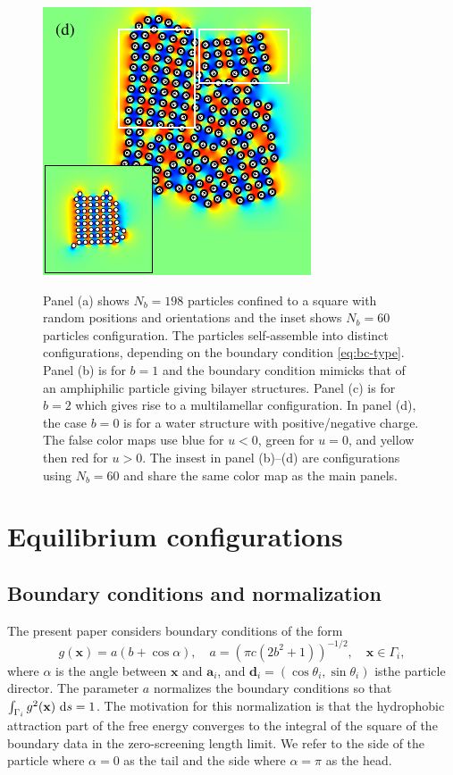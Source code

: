 \documentclass[prb,preprint,showpacs,preprintnumbers,amsmath,amssymb,longbibliography]{revtex4-1}
\renewcommand{\aa}{\mathbf{a}}
\newcommand{\dd}{\mathbf{d}}
\newcommand{\xx}{\mathbf{x}}
\begin{document}
\begin{figure}[h!]
\begin{center}
  \includegraphics[height=0.3\textheight]{Nb198d_eta_inset.pdf}
\end{center}
\begin{caption}{\label{fig:relax}
  Panel (a) shows $N_b = 198$ particles confined to a square with random 
  positions and orientations and the inset shows $N_b=60$ particles configuration.
  The particles self-assemble into distinct configurations,
  depending on the boundary condition \eqref{eq:bc-type}.
  Panel (b) is for $b=1$ and the boundary condition mimicks that
  of an amphiphilic particle giving bilayer structures. 
  Panel (c) is for $b=2$ which gives rise to a multilamellar configuration. 
  In panel (d), the case $b = 0$ is for a water structure with
  positive/negative charge. 
  The false color maps use blue for $u < 0$, green for $u = 0$, and yellow then red for $u > 0$.
  The insest in panel (b)--(d) are configurations using $N_b=60$ and share the same color map
  as the main panels.}
\end{caption}
\end{figure}

\section{Equilibrium configurations}
\subsection{Boundary conditions and normalization}
The present paper considers boundary conditions of the form
\begin{equation}
  \label{eq:bc-type}
g(\xx) = a(b + \cos \alpha),\quad a = (\pi c(2b^2 + 1))^{-1/2},\quad \xx \in \Gamma_i,
\end{equation}
where $\alpha$ is the angle between $\xx$ and  $\aa_i$, and 
$\dd_i = (\cos \theta_i, \sin \theta_i)$ isthe particle director.
The parameter $a$ normalizes the boundary conditions 
so that $\int_{\Gamma_i} g^2(\xx) \, \dif s = 1$.
The motivation for this normalization is that the hydrophobic attraction
part of the free energy converges to the integral of the square of the boundary
data in the zero-screening length limit.  
We refer to the side of the particle where $\alpha = 0$
as the tail and the side where $\alpha = \pi$ as the head. 
\end{document}
